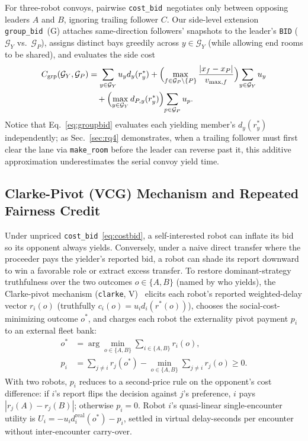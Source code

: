 \documentclass[letterpaper,journal]{IEEEtran}
\newcommand{\cb}{\texttt{cost\_bid}}
\newcommand{\gb}{\texttt{group\_bid}}
\begin{document}
For three-robot convoys, pairwise \cb\ negotiates only between opposing leaders $A$ and $B$, ignoring trailing follower $C$. Our side-level extension \gb\ (G) attaches same-direction followers' snapshots to the leader's \texttt{BID} ($\mathcal{G}_Y$ vs.\ $\mathcal{G}_P$), assigns distinct bays greedily across $y\in\mathcal{G}_Y$ (while allowing end rooms to be shared), and evaluates the side cost
\begin{equation}
\begin{aligned}
C_{\mathrm{grp}}(\mathcal{G}_Y,\mathcal{G}_P) &= \sum_{y\in\mathcal{G}_Y} u_y d_y(r_y^\ast) + \Bigl(\max_{f\in\mathcal{G}_P\setminus\{P\}}\frac{|x_f-x_P|}{v_{\max,f}}\Bigr)\!\sum_{y\in\mathcal{G}_Y} u_y \\
&\quad + \Bigl(\max_{y\in\mathcal{G}_Y} d_{P,y}(r_y^\ast)\Bigr)\!\sum_{p\in\mathcal{G}_P} u_p.
\end{aligned}
\label{eq:groupbid}
\end{equation}
Notice that Eq.~\eqref{eq:groupbid} evaluates each yielding member's $d_y(r_y^\ast)$ independently; as Sec.~\ref{sec:rq4} demonstrates, when a trailing follower must first clear the lane via \texttt{make\_room} before the leader can reverse past it, this additive approximation underestimates the serial convoy yield time.

\subsection{Clarke-Pivot (VCG) Mechanism and Repeated Fairness Credit}
Under unpriced \cb~\eqref{eq:costbid}, a self-interested robot can inflate its bid so its opponent always yields. Conversely, under a naive direct transfer where the proceeder pays the yielder's reported bid, a robot can shade its report downward to win a favorable role or extract excess transfer. To restore dominant-strategy truthfulness over the two outcomes $o\in\{A,B\}$ (named by who yields), the Clarke-pivot mechanism (\texttt{clarke}, V)~\cite{clarke1971multipart} elicits each robot's reported weighted-delay vector $r_i(o)$ (truthfully $c_i(o)=u_i d_i(r^\ast(o))$), chooses the social-cost-minimizing outcome $o^\ast$, and charges each robot the externality pivot payment $p_i$ to an external fleet bank:
\begin{equation}
\begin{aligned}
o^\ast &= \arg\min_{o\in\{A,B\}} \sum_{i\in\{A,B\}} r_i(o), \\
p_i &= \sum_{j\neq i} r_j(o^\ast) - \min_{o\in\{A,B\}} \sum_{j\neq i} r_j(o) \ge 0.
\end{aligned}
\label{eq:clarke}
\end{equation}
With two robots, $p_i$ reduces to a second-price rule on the opponent's cost difference: if $i$'s report flips the decision against $j$'s preference, $i$ pays $|r_j(A)-r_j(B)|$; otherwise $p_i=0$. Robot $i$'s quasi-linear single-encounter utility is $U_i = -u_i d_i^{\mathrm{real}}(o^\ast) - p_i$, settled in virtual delay-seconds per encounter without inter-encounter carry-over.
\end{document}
